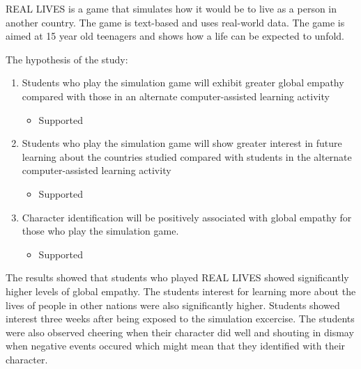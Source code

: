 REAL LIVES is a game that simulates how it would be to live as a person in another country. The game is text-based and uses real-world data. The game is aimed at 15 year old teenagers and shows how a life can be expected to unfold. 

The hypothesis of the study:
\begin{enumerate}
    \item Students who play the simulation game will exhibit greater global empathy compared with those in an alternate computer-assisted learning activity
    \begin{itemize}
        \item Supported
    \end{itemize}
    \item Students who play the simulation game will show greater interest in future learning about the countries studied compared with students in the alternate computer-assisted learning activity
    \begin{itemize}
        \item Supported
    \end{itemize}
    \item Character identification will be positively associated with global empathy for those who play the simulation game.
    \begin{itemize}
        \item Supported
    \end{itemize}
\end{enumerate}

The results showed that students who played REAL LIVES showed significantly higher levels of global empathy. The students interest for learning more about the lives of people in other nations were also significantly higher. Students showed interest three weeks after being exposed to the simulation excercise. The students were also observed cheering when their character did well and shouting in dismay when negative events occured which might mean that they identified with their character.

